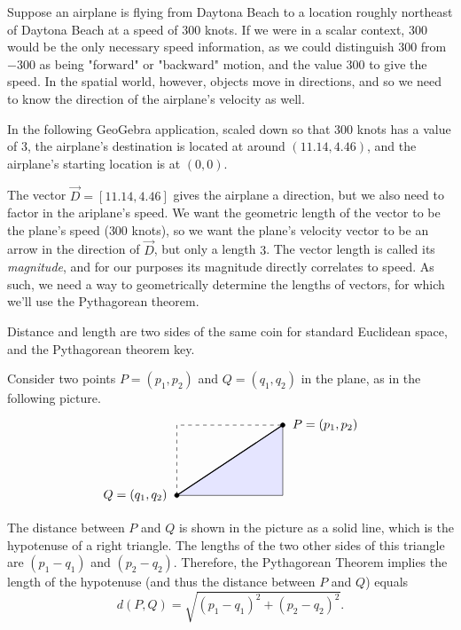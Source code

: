 \documentclass{ximera}
\begin{document}
\begin{example}
    
  Suppose an airplane is flying from Daytona Beach to a location roughly northeast of Daytona Beach at a speed of $300$ knots. If we were in a scalar context, $300$ would be the only necessary speed information, as we could distinguish $300$ from $-300$ as being "forward" or "backward" motion, and the value $300$ to give the speed. In the spatial world, however, objects move in directions, and so we need to know the direction of the airplane's velocity as well.

  In the following GeoGebra application, scaled down so that $300$ knots has a value of $3$, the airplane's destination is located at around $(11.14,4.46)$, and the airplane's starting location is at $(0,0)$. 

  \begin{center}
  \end{center}

  The vector $\vec{D}=[11.14,4.46]$ gives the airplane a direction, but we also need to factor in the ariplane's speed. We want the geometric length of the vector to be the plane's speed ($300$ knots), so we want the plane's velocity vector to be an arrow in the direction of $\vec{D}$, but only a length $3$. The vector length is called its \textit{magnitude}, and for our purposes its magnitude directly correlates to speed. As such, we need a way to geometrically determine the lengths of vectors, for which we'll use the Pythagorean theorem.

  \begin{remark}

    Distance and length are two sides of the same coin for standard Euclidean space, and the Pythagorean theorem key.

    Consider two points $P=(p_1,p_2)$ and
    $Q=(q_1,q_2)$ in the plane, as in the following picture.
    \begin{equation*}
      \begin{tikzpicture}[scale=1]
        \draw[dashed] (0,0) -- (0,2) -- (3,2);
        \draw[fill=blue!10] (0,0) -- (3,0) -- (3,2) -- cycle;
        \draw[thick] (0,0) -- (3,2);
        \draw[fill](0,0) circle [radius=1.8pt] node[left=1ex]{$Q=(q_1,q_2)$};
        \draw[fill](3,2) circle [radius=1.8pt] node[right=1ex]{$P=(p_1,p_2)$};
      \end{tikzpicture}
    \end{equation*}
    The distance between $P$ and $Q$ is shown in the picture as a solid
    line, which is the hypotenuse of a right triangle.  The lengths of the
    two other sides of this triangle are $(p_1-q_1)$ and
    $(p_2-q_2)$. Therefore, the Pythagorean Theorem implies the
    length of the hypotenuse (and thus the distance between $P$ and $Q$)
    equals
    \begin{equation*}
      d(P,Q)
      =\sqrt{(p_1-q_1)^2+(p_2-q_2)^2}.
    \end{equation*}


\end{remark}
\end{example}
\end{document}

